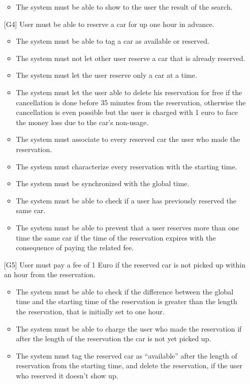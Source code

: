 \documentclass[10pt, a4paper,titlepage]{article}
\begin{document}
\begin{itemize}
\begin{itemize}
\item The system must be able to show to the user the result of the search.
\end{itemize}
\item [{[G4]}] User must be able to reserve a car for up one hour in advance.
\begin{itemize}
\item The system must be able to tag a car as available or reserved.
\item The system must not let other user reserve a car that is already reserved.
\item The system must let the user reserve only a car at a time.
\item The system must let the user able to delete his reservation for free if the cancellation is done before 35 minutes from the reservation, otherwise the cancellation is even possible but the user is charged with 1 euro to face the money loss due to the car's non-usage.
\item The system must associate to every reserved car the user who made the reservation.
\item The system must characterize every reservation with the starting time.
\item The system must be synchronized with the global time. 
\item The system must be able to check if a user has previously reserved the same car.
\item The system must be able to prevent that a user reserves more than one time the same car if the time of the reservation expires with the consequence of paying the related fee.
\end{itemize}
\item [{[G5]}] User must pay a fee of 1 Euro if the reserved car is not picked up within an hour from the reservation.
\begin{itemize}
\item The system must be able to check if the difference between the global time and the starting time of the reservation is greater than the length the reservation, that is initially set to one hour.
\item The system must be able to charge the user who made the reservation if after the length of the reservation the car is not yet picked up.
\item The system must tag the reserved car as “available” after the length of reservation from the starting time, and delete the reservation, if the user who reserved it doesn't show up.

\end{itemize}
\end{itemize}
\end{document}
